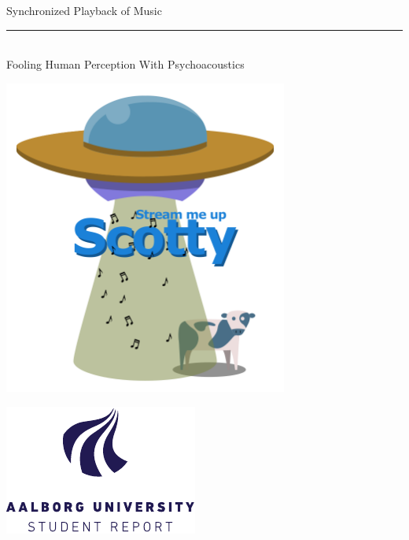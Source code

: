 %
\newcommand{\titlefont}{\sffamily\fontsize{36pt}{0pt}\selectfont}
\newcommand{\subtitlefont}{\sffamily\fontsize{26pt}{0pt}\selectfont}
\newcommand{\smallfont}{\sffamily\fontsize{12pt}{0pt}\selectfont}
\begin{titlepage}
    \noindent%
        \begin{center}
            \titlefont Synchronized Playback of Music\\
            \vspace{0.2cm}
            \rule{90pt}{1pt}\\
            \vspace{0.2cm}
            \subtitlefont Fooling Human Perception With Psychoacoustics
        \end{center}
    \null\vfill
    \begin{minipage}{1\textwidth}
        \centering
        \includegraphics[width=0.7\textwidth]{img/scotty_white.png}
    \end{minipage}
    \null\vfill
    \vspace*{1cm}
    \noindent
    \begin{minipage}{0.35\linewidth}
        \begin{flushleft}
        \includegraphics[width=0.8\linewidth]{img/aau_logo_en.pdf}

\end{flushleft}
\end{minipage}
\end{titlepage}
